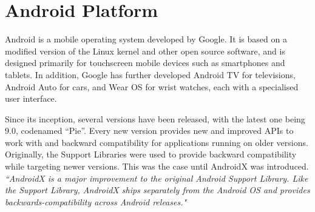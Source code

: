 \documentclass[thesis=B,english]{FITthesis}[2012/10/20]
\newcommand{\quoting}[1]{\textit{``#1"}}
\begin{document}
	\section{Android Platform}
Android is a mobile operating system developed by Google. It is based on a modified version of the Linux kernel and other open source software, and is designed primarily for touchscreen mobile devices such as smartphones and tablets. In addition, Google has further developed Android TV for televisions, Android Auto for cars, and Wear OS for wrist watches, each with a specialised user interface.

Since its inception, several versions have been released, with the latest one being 9.0, codenamed \enquote{Pie}. Every new version provides new and improved APIs to work with and backward compatibility for applications running on older versions. Originally, the Support Libraries were used to provide backward compatibility while targeting newer versions. This was the case until AndroidX was introduced.
 \quoting{AndroidX is a major improvement to the original Android Support Library. Like the Support Library, AndroidX ships separately from the Android OS and provides backwards-compatibility across Android releases.} \cite{androix-overview}
\end{document}
